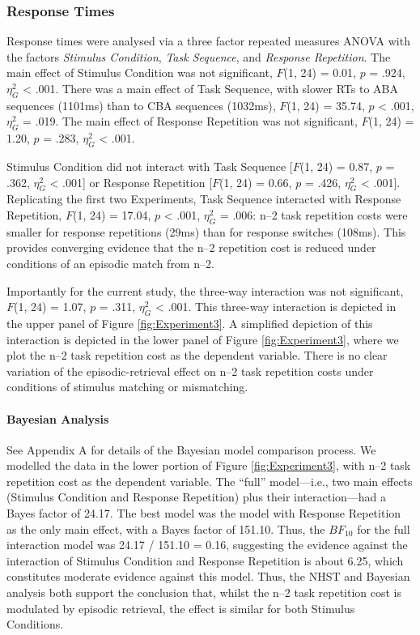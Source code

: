 \documentclass[a4paper, doc, natbib]{apa6}
\begin{document}
\subsubsection{Response Times}
Response times were analysed via a three factor repeated measures ANOVA with the factors \emph{Stimulus Condition}, \emph{Task Sequence}, and \emph{Response Repetition}. The main effect of Stimulus Condition was not significant, $F$(1, 24) = 0.01, $p$ = .924, $\eta_G^2$ < .001. There was a main effect of Task Sequence, with slower RTs to ABA sequences (1101ms) than to CBA sequences (1032ms), $F$(1, 24) = 35.74, $p$ < .001, $\eta_G^2$ = .019. The main effect of Response Repetition was not significant, $F$(1, 24) = 1.20, $p$ = .283, $\eta_G^2$ < .001.

Stimulus Condition did not interact with Task Sequence [$F$(1, 24) = 0.87, $p$ = .362, $\eta_G^2$ < .001] or Response Repetition [$F$(1, 24) = 0.66, $p$ = .426, $\eta_G^2$ < .001]. Replicating the first two Experiments, Task Sequence interacted with Response Repetition, $F$(1, 24) = 17.04, $p$ < .001, $\eta_G^2$ = .006: n--2 task repetition costs were smaller for response repetitions (29ms) than for response switches (108ms). This provides converging evidence that the n--2 repetition cost is reduced under conditions of an episodic match from n--2. 

Importantly for the current study, the three-way interaction was not significant, $F$(1, 24) = 1.07, $p$ = .311, $\eta_G^2$ < .001. This three-way interaction is depicted in the upper panel of Figure \ref{fig:Experiment3}. A simplified depiction of this interaction is depicted in the lower panel of Figure \ref{fig:Experiment3}, where we plot the n--2 task repetition cost as the dependent variable. There is no clear variation of the episodic-retrieval effect on n--2 task repetition costs under conditions of stimulus matching or mismatching.  

\paragraph{Bayesian Analysis}
See Appendix A for details of the Bayesian model comparison process. We modelled the data in the lower portion of Figure \ref{fig:Experiment3}, with n--2 task repetition cost as the dependent variable. The ``full'' model---i.e., two main effects (Stimulus Condition and Response Repetition) plus their interaction---had a Bayes factor of 24.17. The best model was the model with Response Repetition as the only main effect, with a Bayes factor of 151.10. Thus, the $BF_{10}$ for the full interaction model was 24.17 / 151.10 = 0.16, suggesting the evidence against the interaction of Stimulus Condition and Response Repetition is about 6.25, which constitutes moderate evidence against this model. Thus, the NHST and Bayesian analysis both support the conclusion that, whilst the n--2 task repetition cost is modulated by episodic retrieval, the effect is similar for both Stimulus Conditions. 
\end{document}
